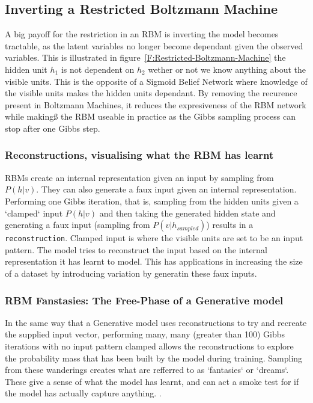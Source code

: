 \subsection{Inverting a Restricted Boltzmann Machine}

A big payoff for the restriction in an RBM is inverting the model becomes tractable, as the latent variables no longer become dependant given the observed variables. This is illustrated in figure~\ref{F:Restricted-Boltzmann-Machine} the hidden unit $h_1$ is not dependent on $h_2$ wether or not we know anything about the visible units. This is the opposite of a Sigmoid Belief Network where knowledge of the visible units makes the hidden units dependant. By removing the recurence present in Boltzmann Machines, it reduces the expresiveness of the RBM network while makingß the RBM useable in practice as the Gibbs sampling process can stop after one Gibbs step\todocite{}.

\subsubsection{Reconstructions, visualising what the RBM has learnt}

RBMs create an internal representation given an input by sampling from $P(h|v)$. They can also generate a faux input given an internal representation. Performing one Gibbs iteration, that is, sampling from the hidden units given a `clamped` input $ P(h|v) $ and then taking the generated hidden state and generating a faux input (sampling from $P(v|h_{sampled})$) results in a \texttt{reconstruction}. Clamped input is where the visible units are set to be an input pattern. The model tries to reconstruct the input based on the internal representation it has learnt to model. This has applications in increasing the size of a dataset by introducing variation by generatin these faux inputs\todocite{}.

\subsubsection{RBM Fanstasies: The Free-Phase of a Generative model}

In the same way that a Generative model uses reconstructions to try and recreate the supplied input vector, performing many, many (greater than 100) Gibbs iterations with no input pattern clamped allows the reconstructions to explore the probability mass that has been built by the model during training. Sampling from these wanderings creates what are refferred to as `fantasies` or `dreams`. These give a sense of what the model has learnt, and can act a smoke test for if the model has actually capture anything.
.

